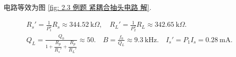 \begin{exampleprob}
    \begin{solution}
        电路等效为图 \ref{fig: 2.3 例题 紧耦合抽头电路 解}.

        \rmg
        \begin{gather*}
            R_s'=\frac{1}{P_1^2}R_s\approx 344.52\ \mathrm{k}\Omega,\quad R_L'=\frac{1}{P_2^2}R_L\approx 342.65\ \mathrm{k}\Omega. \\
            Q_L=\frac{Q_0}{1+\dfrac{R_p}{R_s'}+\dfrac{R_p}{R_L'}}\approx 50.\quad B=\frac{f_0}{Q_L}\approx 9.3\ \mathrm{kHz}.\quad I_s'=P_1I_s=0.28\ \mathrm{mA}.
        \end{gather*}
    \end{solution}
\end{exampleprob}

